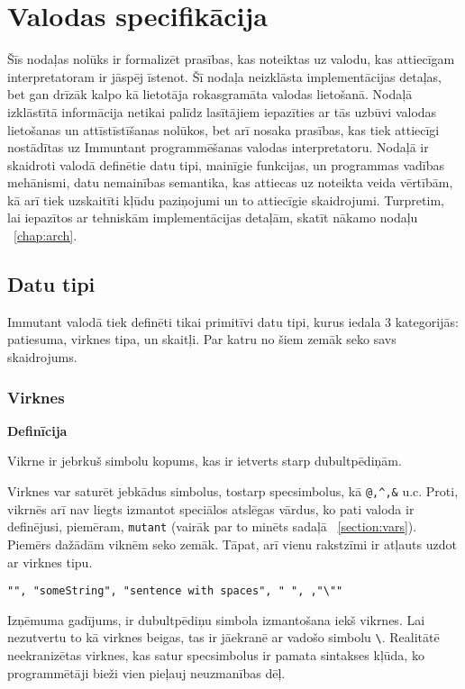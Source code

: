 \documentclass[12pt,a4paper]{report}
\begin{document}
\newpage
\chapter{Valodas specifikācija}

Šīs nodaļas nolūks ir formalizēt prasības, kas noteiktas uz valodu, kas attiecīgam interpretatoram ir jāspēj īstenot. Šī nodaļa neizklāsta implementācijas detaļas, bet gan drīzāk kalpo kā lietotāja rokasgramāta valodas lietošanā.
Nodaļā izklāstītā informācija netikai palīdz lasītājiem iepazīties ar tās uzbūvi valodas lietošanas un attīstīstīšanas nolūkos, bet arī nosaka prasības, kas tiek attiecīgi nostādītas uz Immuntant programmēšanas valodas interpretatoru.
Nodaļā ir skaidroti valodā definētie datu tipi, mainīgie funkcijas, un programmas vadības mehānismi, datu nemainības semantika, kas attiecas uz noteikta veida vērtībām, kā arī tiek uzskaitīti kļūdu paziņojumi un to attiecīgie skaidrojumi.
Turpretim, lai iepazītos ar tehniskām implementācijas detaļām, skatīt nākamo nodaļu ~\ref{chap:arch}.

\section{Datu tipi}

Immutant valodā tiek definēti tikai primitīvi datu tipi, kurus iedala 3 kategorijās: patiesuma, virknes tipa, un skaitļi. Par katru no šiem zemāk seko savs skaidrojums.


\subsection{Virknes}
\textbf{Definīcija}

Vikrne ir jebrkuš simbolu kopums, kas ir ietverts starp dubultpēdiņām.

Virknes var saturēt jebkādus simbolus, tostarp specsimbolus, kā \texttt{@,\^\space,\&} u.c. Proti, vikrnēs arī nav liegts izmantot speciālos atslēgas vārdus, ko pati valoda ir definējusi, piemēram, \texttt{mutant} (vairāk par to minēts sadaļā ~\ref{section:vars}).
Piemērs dažādām viknēm seko zemāk. Tāpat, arī vienu rakstzīmi ir atļauts uzdot ar virknes tipu.

\begin{verbatim}
"", "someString", "sentence with spaces", " ", ,"\""
\end{verbatim}

Izņēmuma gadījums, ir dubultpēdiņu simbola izmantošana iekš vikrnes. Lai nezutvertu to kā virknes beigas, tas ir jāekranē ar vadošo simbolu \texttt{\textbackslash}. Realitātē neekranizētas virknes, kas satur specsimbolus ir pamata sintakses kļūda, ko programmētāji bieži vien pieļauj neuzmanības dēļ. 
\end{document}
